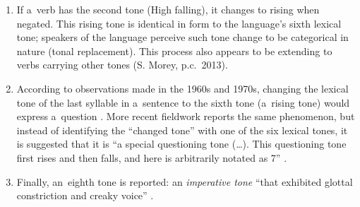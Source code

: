 \begin{enumerate}[label=(\roman*)]
	\item  If a~verb has the second tone
	(High falling), it changes to rising when negated. This rising tone is identical in form to the
	language's sixth lexical tone; speakers of the language perceive such tone change to be categorical in nature (tonal replacement). This process also appears to be extending to verbs carrying other tones (S. Morey, p.c.\ 2013). 
	
	\item  According to
	observations made in the 1960s and 1970s, changing the lexical tone of the last syllable in
	a~sentence to the sixth tone (a~rising tone) would express a~{question} \citep{banchob1987}. More
	recent fieldwork reports the same phenomenon, but instead of identifying the “changed tone” with one
	of the six lexical tones, it is suggested that it is “a special questioning tone ({\dots}). This
	questioning tone first rises and then falls, and here is arbitrarily notated as 7”
	\citep[234]{morey2008}.
	
	\item  Finally, an~eighth tone is reported: an \textit{imperative tone} “that exhibited
	glottal constriction and creaky voice” \citep[239]{morey2008}. 
\end{enumerate}

%
%

